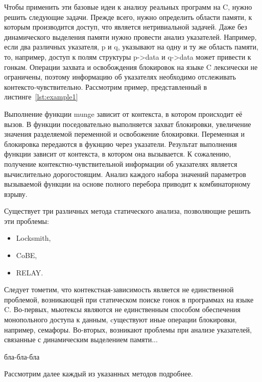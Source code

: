 Чтобы применить эти базовые идеи к анализу реальных программ на C, нужно решить следующие задачи. Прежде всего, нужно определить области памяти, к которым производится доступ, что является нетривиальной задачей. Даже без динамического выделения памяти нужно провести анализ указателей. Например, если два различных указателя, p и q, указывают на одну и ту же область памяти, то, например, доступ к полям структуры p->data и q->data может привести к гонкам. Операции захвата и освобождения блокировок на языке C лексически не ограничены, поэтому информацию об указателях необходимо отслеживать контексто-чувствительно. Рассмотрим пример, представленный в листинге~\ref{lst:example1} 



Выполнение функции munge зависит от контекста, в котором происходит её вызов. В функции поседовательно выполняется захват блокировки, увеличение значения разделяемой переменной и освобожение блокировки. Переменная и блокировка передаются в фукнцию через указатели. Результат выполнения функции зависит от контекста, в котором она вызывается. К сожалению, получение контекстно-чувствительной информации об указателях является вычислительно дорогостоящим. Анализ каждого набора значений параметров вызываемой функции на основе полного перебора приводит к комбинаторному взрыву.

Существует три различных метода статического анализа, позволяющие решить эти проблемы:
\begin{itemize}
\item Locksmith,
\item CoBE,
\item RELAY.
\end{itemize}

Следует тометим, что контекстная-зависимость является не единственной проблемой, возникающей при статическом поиске гонок в программах на языке C. Во-первых, мьютексы являются не единственным способом обеспечения монопольного доступа к данным, cуществуют иные операции блокировки, например, семафоры. Во-вторых, возникают проблемы при анализе указателей, связанные с динамическим выделением памяти...

бла-бла-бла

Рассмотрим далее каждый из указанных методов подробнее.

